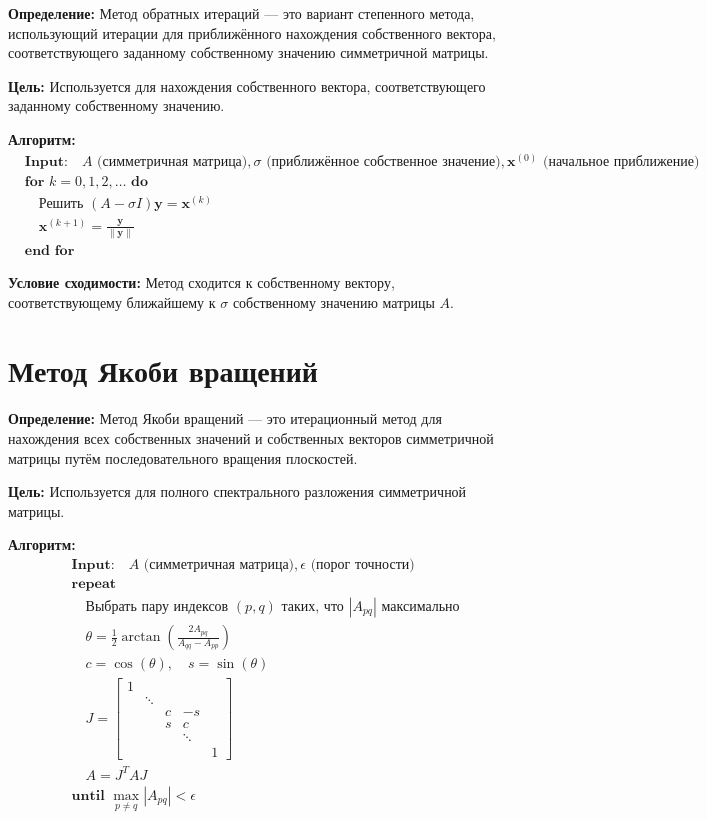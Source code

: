 \documentclass{article}
\begin{document}
\textbf{Определение:} Метод обратных итераций — это вариант степенного метода, использующий итерации для приближённого нахождения собственного вектора, соответствующего заданному собственному значению симметричной матрицы.

\textbf{Цель:} Используется для нахождения собственного вектора, соответствующего заданному собственному значению.

\textbf{Алгоритм:}
\[
\begin{aligned}
&\textbf{Input:} \quad A \text{ (симметричная матрица)}, \sigma \text{ (приближённое собственное значение)}, \mathbf{x}^{(0)} \text{ (начальное приближение)} \\
&\textbf{for } k = 0, 1, 2, \ldots \textbf{ do} \\
&\quad \text{Решить } (A - \sigma I)\mathbf{y} = \mathbf{x}^{(k)} \\
&\quad \mathbf{x}^{(k+1)} = \frac{\mathbf{y}}{\|\mathbf{y}\|} \\
&\textbf{end for}
\end{aligned}
\]

\textbf{Условие сходимости:} Метод сходится к собственному вектору, соответствующему ближайшему к \( \sigma \) собственному значению матрицы \( A \).

\section{Метод Якоби вращений}

\textbf{Определение:} Метод Якоби вращений — это итерационный метод для нахождения всех собственных значений и собственных векторов симметричной матрицы путём последовательного вращения плоскостей.

\textbf{Цель:} Используется для полного спектрального разложения симметричной матрицы.

\textbf{Алгоритм:}
\[
\begin{aligned}
&\textbf{Input:} \quad A \text{ (симметричная матрица)}, \epsilon \text{ (порог точности)} \\
&\textbf{repeat} \\
&\quad \text{Выбрать пару индексов } (p,q) \text{ таких, что } |A_{pq}| \text{ максимально} \\
&\quad \theta = \frac{1}{2} \arctan \left( \frac{2A_{pq}}{A_{qq} - A_{pp}} \right) \\
&\quad c = \cos(\theta), \quad s = \sin(\theta) \\
&\quad J = \begin{bmatrix}
1 & & & \\
& \ddots & & \\
& & c & -s \\
& & s & c \\
& & & \ddots \\
& & & & 1
\end{bmatrix} \\
&\quad A = J^T A J \\
&\textbf{until } \max_{p \neq q} |A_{pq}| < \epsilon
\end{aligned}
\]
\end{document}
